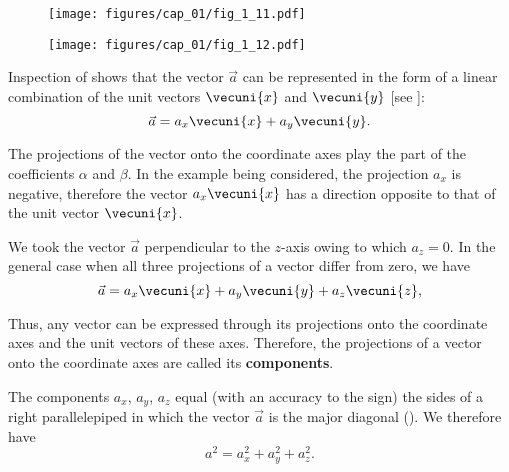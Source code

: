 \begin{figure}[t]
	\begin{minipage}[t]{0.5\linewidth}
		\begin{center}
			\texttt{[image: figures/cap\_01/fig\_1\_11.pdf]}
			\caption[]{}
			\label{fig:1_11}
		\end{center}
	\end{minipage}
	\hfill{ }%
	\begin{minipage}[t]{0.5\linewidth}
		\begin{center}
			\texttt{[image: figures/cap\_01/fig\_1\_12.pdf]}
			\caption[]{}
			\label{fig:1_12}
		\end{center}
	\end{minipage}
	\vspace{-0.8cm}
\end{figure}

Inspection of  shows that the vector $\vec{a}$ can be represented in the form of a linear combination of the unit vectors $\vecuni{x}$ and $\vecuni{y}$ [see ]:
\begin{equation*}
\vec{a} = a_x \vecuni{x} + a_y \vecuni{y}.
\end{equation*}

\noindent
The projections of the vector onto the coordinate axes play the part of the coefficients $\alpha$ and $\beta$. In the example being considered, the projection $a_x$ is negative, therefore the vector $a_x\vecuni{x}$ has a direction opposite to that of the unit vector $\vecuni{x}$.

We took the vector $\vec{a}$ perpendicular to the $z$-axis owing to which $a_z=0$. In the general case when all three projections of a vector differ from zero, we have
\begin{equation}\label{eq:1_9}
\vec{a} = a_x \vecuni{x} + a_y \vecuni{y} + a_z \vecuni{z},
\end{equation}

\noindent
Thus, any vector can be expressed through its projections onto the coordinate axes and the unit vectors of these axes. Therefore, the projections of a vector onto the coordinate axes are called its \textbf{components}.

The components $a_x$, $a_y$, $a_z$ equal (with an accuracy to the sign) the sides of a right parallelepiped in which the vector $\vec{a}$ is the major diagonal (). We therefore have
\begin{equation}\label{eq:1_10}
a^2 = a_x^2 + a_y^2 + a_z^2.
\end{equation}

